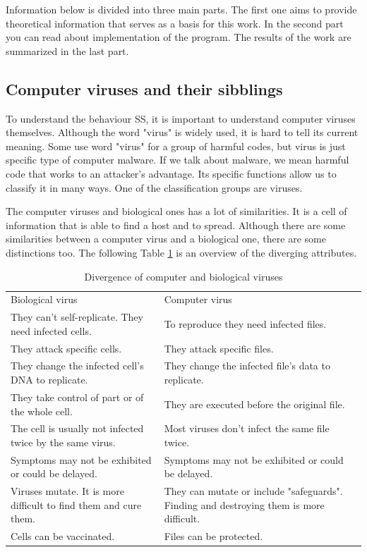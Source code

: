 \documentclass[review]{elsarticle}
\begin{document}
Information below is divided into three main parts. The first one aims to provide theoretical information that serves as a basis for this work. In the second part you can read about implementation of the program. The results of the work are summarized in the last part.


\subsection{Computer viruses and their sibblings}
To understand the behaviour SS, it is important to understand computer viruses themselves. Although the word "virus" is widely used, it is hard to tell its current meaning. Some use word "virus" for a group of harmful codes, but virus is just specific type of computer malware. If we talk about malware, we mean harmful code that works to an attacker's advantage. Its specific functions allow us to classify it in many ways. One of the classification groups are viruses.
\vspace{5pt}

The computer viruses and biological ones has a lot of similarities. \cite{viryHak} \cite{webroot} It is a cell of information that is able to find a host and to spread. \cite{norton} Although there are some similarities between a computer virus and a biological one, there are some distinctions too. The following Table \ref{diverg} is an overview of the diverging attributes.


\begin{table}[!h]
	\centering
	\caption{Divergence of computer and biological viruses}
	\label{diverg}
	\small
\begin{tabular}{ p{6cm} | p{6cm} }
	Biological virus & Computer virus \\
	They can't self-replicate. They need infected cells. & To reproduce they need infected files. \\
	They attack specific cells. & They attack specific files. \\
	They change the infected cell's DNA to replicate. & They change the infected file's data to replicate. \\
	They take control of part or of the whole cell. & They are executed before the original file. \\
	The cell is usually not infected twice by the same virus. & Most viruses don't infect the same file twice. \\
	Symptoms may not be exhibited or could be delayed. & Symptoms may not be exhibited or could be delayed. \\
	Viruses mutate. It is more difficult to find them and cure them. & They can mutate or include "safeguards". Finding and destroying them is more difficult. \\
	Cells can be vaccinated. & Files can be protected. \\
	\hline	
\end{tabular}
\end{table}
\end{document}
